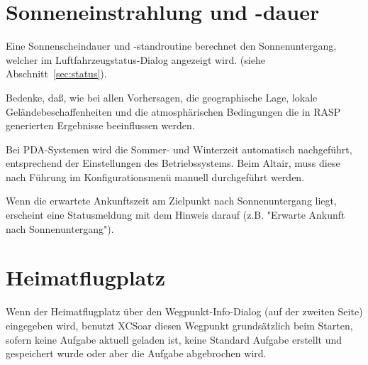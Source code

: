\section{Sonneneinstrahlung und -dauer}

Eine Sonnenscheindauer und -standroutine berechnet den Sonnenuntergang, welcher im Luftfahrzeugstatus-Dialog angezeigt wird. (siehe Abschnitt~\ref{sec:status}).

Bedenke, daß, wie bei allen Vorhersagen, die geographische Lage, lokale Geländebeschaffenheiten und die atmosphärischen Bedingungen die in RASP generierten Ergebnisse beeinflussen werden.

Bei PDA-Systemen wird die Sommer- und Winterzeit automatisch nachgeführt, entsprechend der Einstellungen des Betriebssystems. Beim Altair, muss diese nach Führung im Konfigurationsmenü manuell durchgeführt werden.

Wenn die erwartete Ankunftszeit am Zielpunkt nach Sonnenuntergang liegt, erscheint eine Statusmeldung mit dem Hinweis darauf (z.B. "Erwarte Ankunft nach Sonnenuntergang").

\section{Heimatflugplatz}
Wenn der Heimatflugplatz über den Wegpunkt-Info-Dialog (auf der zweiten Seite) eingegeben wird, benutzt \textsf{XCSoar} diesen Wegpunkt grundsätzlich beim Starten, sofern keine Aufgabe aktuell geladen ist, keine Standard Aufgabe erstellt und gespeichert wurde oder aber die Aufgabe abgebrochen wird. 
\clearpage
